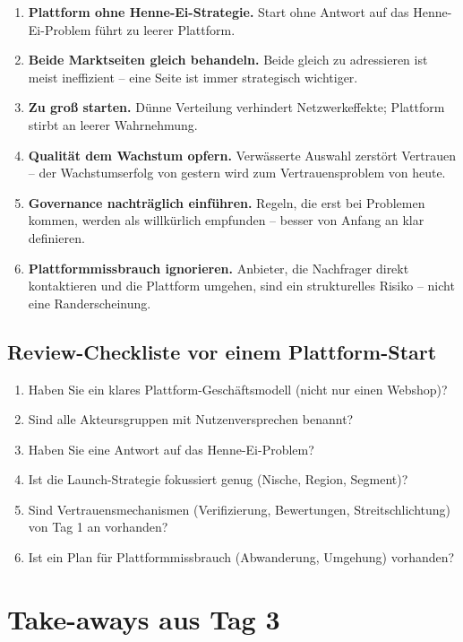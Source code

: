 \documentclass[11pt,a4paper,oneside]{article}
\newcommand{\fachbegriff}[1]{\textbf{#1}}
\begin{document}
\begin{enumerate}
  \item \fachbegriff{Plattform ohne Henne-Ei-Strategie.} Start ohne Antwort auf das Henne-Ei-Problem führt zu leerer Plattform.
  \item \fachbegriff{Beide Marktseiten gleich behandeln.} Beide gleich zu adressieren ist meist ineffizient -- eine Seite ist immer strategisch wichtiger.
  \item \fachbegriff{Zu groß starten.} Dünne Verteilung verhindert Netzwerkeffekte; Plattform stirbt an leerer Wahrnehmung.
  \item \fachbegriff{Qualität dem Wachstum opfern.} Verwässerte Auswahl zerstört Vertrauen -- der Wachstumserfolg von gestern wird zum Vertrauensproblem von heute.
  \item \fachbegriff{Governance nachträglich einführen.} Regeln, die erst bei Problemen kommen, werden als willkürlich empfunden -- besser von Anfang an klar definieren.
  \item \fachbegriff{Plattformmissbrauch ignorieren.} Anbieter, die Nachfrager direkt kontaktieren und die Plattform umgehen, sind ein strukturelles Risiko -- nicht eine Randerscheinung.
\end{enumerate}

\subsection{Review-Checkliste vor einem Plattform-Start}

\begin{enumerate}
  \item Haben Sie ein klares Plattform-Geschäftsmodell (nicht nur einen Webshop)?
  \item Sind alle Akteursgruppen mit Nutzenversprechen benannt?
  \item Haben Sie eine Antwort auf das Henne-Ei-Problem?
  \item Ist die Launch-Strategie fokussiert genug (Nische, Region, Segment)?
  \item Sind Vertrauensmechanismen (Verifizierung, Bewertungen, Streitschlichtung) von Tag 1 an vorhanden?
  \item Ist ein Plan für Plattformmissbrauch (Abwanderung, Umgehung) vorhanden?
\end{enumerate}

\section{Take-aways aus Tag 3}
\end{document}
